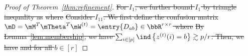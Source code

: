 \documentclass[lettersize,onecolumn,journal]{IEEEtran}
\theoremstyle{definition}
\theoremstyle{definition}
\newcommand{\of}[1]{\left(#1\right)}
\newcommand{\offf}[1]{\left\{#1\right\}}
\providecommand{\DIFdeltex}[1]{{\protect\color{red}\sout{#1}}}                      %
\providecommand{\DIFdel}[1]{\texorpdfstring{\DIFdeltex{#1}}{}} %
\begin{document}
\begin{proof}[Proof of Theorem~\ref{thm:refinement}]
\DIFdel{For $I_1$, we further bound $I_1$ by triangle inequality as
    }%
\DIFdel{where
     }%
\DIFdel{Consider $I_{11}$. We first define the confusion matrix $\mD = \mM^T \mTheta^T \mW^{(t)} = \entry{D_{ab}} \in \bbR^{r \times r}$ where 
    }%
\DIFdel{By Lemma~\ref{lem:membership},  we have $\sum_{i \in [p]}  \ind\offf{  z^{(t)}(i) = b } \gtrsim p/r$. Then, we have
    }%
\DIFdel{and for all $b \in [r]$
    }%

\end{proof}
\end{document}
